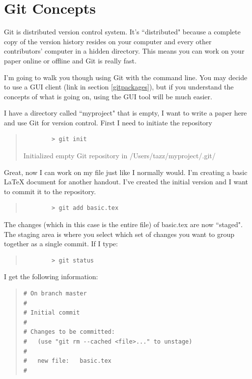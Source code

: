 \section{Git Concepts}
\label{sec:concepts}

Git is distributed version control system.  It's ``distributed" because a complete copy of the version history resides on your computer and every other contributors' computer in a hidden directory.  This means you can work on your paper online or offline and Git is really fast.

I'm going to walk you though using Git with the command line.  You may decide to use a GUI client (link in section \ref{gitpackages}), but if you understand the concepts of what is going on, using the GUI tool will be much easier.

I have a directory called ``myproject" that is empty, I want to write a paper here and use Git for version control.  First I need to initiate the repository

\begin{quote}
	\begin{verbatim}
		> git init
	\end{verbatim}
	Initialized empty Git repository in /Users/tazz/myproject/.git/
\end{quote}

Great, now I can work on my file just like I normally would.  I'm creating a basic LaTeX document for another handout.  I've created the initial version and I want to commit it to the repository.

\begin{quote}
	\begin{verbatim}
		> git add basic.tex
	\end{verbatim}
\end{quote}

The changes (which in this case is the entire file) of basic.tex are now ``staged".  The staging area is where you select which set of changes you want to group together as a single commit.  If I type:

\begin{quote}
	\begin{verbatim}
		> git status
	\end{verbatim}
\end{quote}

I get the following information:

\begin{quote}
	\begin{verbatim}
# On branch master
#
# Initial commit
#
# Changes to be committed:
#   (use "git rm --cached <file>..." to unstage)
#
#	new file:   basic.tex
#

\end{verbatim}
\end{quote}


